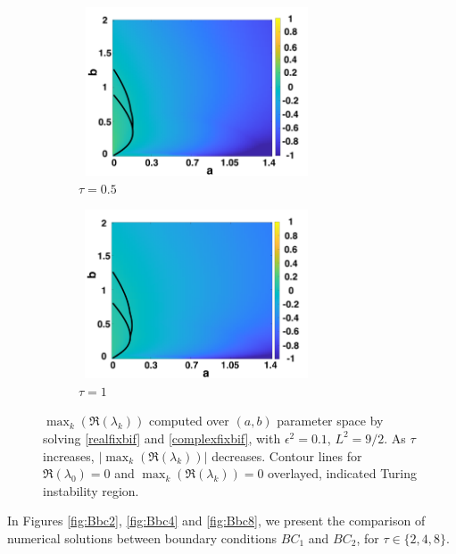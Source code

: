 \begin{figure}[H]
  \centering
\begin{subfigure}[t]{0.45\textwidth}
    \centering
    \includegraphics[width=7cm,height=5cm]{fixbif22.png}
    \caption{$\tau=0.5$}
    \label{}
\end{subfigure}
\hfill
\begin{subfigure}[t]{0.45\textwidth}
    \centering
    \includegraphics[width=7cm,height=5cm]{fixbif23.png}
    \caption{$\tau=1$}
    \label{}
\end{subfigure}
\caption{$\max_k(\Re(\lambda_k))$ computed over $(a,b)$ parameter space by solving \eqref{realfixbif} and \eqref{complexfixbif}, with $\epsilon^2=0.1$, $L^2=9/2$. As $\tau$ increases, $|\max_k(\Re(\lambda_k))|$ decreases. Contour lines for $\Re(\lambda_0)=0$ and $\max_k(\Re(\lambda_k))=0$ overlayed, indicated Turing instability region. }
\label{fig:Bbif2}
\end{figure}

In Figures \ref{fig:Bbc2}, \ref{fig:Bbc4} and \ref{fig:Bbc8}, we present the comparison of numerical solutions between boundary conditions $BC_1$ and $BC_2$, for $\tau\in\{2,4,8\}$.

